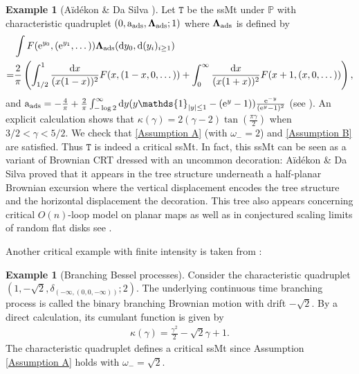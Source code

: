 \documentclass[12pt]{article}
\numberwithin{equation}{section}
\theoremstyle{plain}
\theoremstyle{definition}
\newtheorem{Ex}[thm]{Example}
\newcommand{\D}{\mathrm{d}}
\newcommand{\Bd}[1]{\boldsymbol{#1}}
\begin{document}
\begin{Ex}[A\"id\'ekon \& Da Silva \cite{aidekon2022growth}]\label{ex: 1} Let $\mathtt{T}$ be the ssMt under $\mathbb{P}$ with characteristic quadruplet $(0,\mathrm{a}_{\rm ads},\Bd\Lambda_{\rm ads};1)$ where $\Bd\Lambda_{\rm ads} $ is defined by
\begin{align*}
    &\int F(\mathrm{e}^{y_0},(\mathrm{e}^{y_1},\dots))\Bd\Lambda_{\rm ads}(\D y_0,\D (y_i)_{i\ge 1}) \\
    =& \frac{2}{\pi} \left(\int_{1/2}^1\frac{\D x}{(x(1-x))^2} F(x,(1-x,0,\dots))+\int_{0}^\infty\frac{\D x}{(x(1+x))^2} F(x+1,(x,0,\dots))\right),
\end{align*}
and $\mathrm{a}_{\rm ads}=-\frac{4}{\pi}+\frac{2}{\pi} \int_{-\log 2}^{\infty} \D y (y\mathds{1}_{|y|\le 1}-(\mathrm{e}^y-1))\frac{\mathrm{e}^{-y}}{(\mathrm{e}^y-1)^2}$ (see \cite[Example.3.13]{BertoinJean2024SMta}). An explicit calculation shows that  $\kappa(\gamma)=2(\gamma-2)\tan(\frac{\pi \gamma}{2})$ when $3/2<\gamma<5/2$. We check that \cref{Assumption A} (with $\omega_- = 2$) and \cref{Assumption B} are satisfied. Thus $\mathtt{T}$ is indeed a critical ssMt. In fact, this ssMt can be seen as a variant of Brownian CRT dressed with an uncommon decoration:
A\"id\'ekon \& Da Silva \cite{aidekon2022growth} proved that it appears in the tree structure underneath a half-planar Brownian excursion where the vertical displacement encodes the tree structure and the horizontal displacement the decoration. This tree also appears concerning critical $O(n)$-loop model on planar maps \cite[Example 3.14]{BertoinJean2024SMta} as well as in conjectured scaling limits of random flat disks see \cite{budd2025discrete}.
\end{Ex}

Another critical example with finite intensity is taken from  \cite[Example 3.3]{BertoinJean2024SMta}:

\begin{Ex}[Branching Bessel processes] Consider the characteristic quadruplet $(1,-\sqrt{2},\delta_{(-\infty,(0,0,-\infty))};2)$. The underlying continuous time branching process is called the binary branching Brownian motion with drift $-\sqrt{2}$. By a direct calculation, its cumulant function is given by
    \begin{align*}
        \kappa(\gamma)=\frac{\gamma^2}{2}-\sqrt{2}\gamma+1.
    \end{align*}
\noindent The characteristic quadruplet defines a critical ssMt since Assumption \ref{Assumption A} holds with $\omega_- = \sqrt2$.
\end{Ex}
\end{document}
